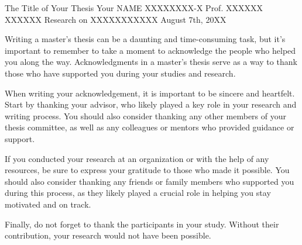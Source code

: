 \documentclass[12pt, a4paper]{report}
\begin{document}
\makecover
  {The Title of Your Thesis}
  {Your NAME}
  {XXXXXXXX-X}
  {Prof. XXXXXX XXXXXX}
  {Research on XXXXXXXXXXX}
  {August 7th, 20XX}

\frontmatter  %

\begin{acknowledgements}
Writing a master's thesis can be a daunting and time-consuming task, but it's
important to remember to take a moment to acknowledge the people who helped you
along the way. Acknowledgments in a master's thesis serve as a way to thank
those who have supported you during your studies and research.

When writing your acknowledgement, it is important to be sincere and heartfelt.
Start by thanking your advisor, who likely played a key role in your research
and writing process. You should also consider thanking any other members of
your thesis committee, as well as any colleagues or mentors who provided
guidance or support.

If you conducted your research at an organization or with the help of any
resources, be sure to express your gratitude to those who made it possible.
You should also consider thanking any friends or family members who supported
you during this process, as they likely played a crucial role in helping you
stay motivated and on track.

Finally, do not forget to thank the participants in your study. Without their
contribution, your research would not have been possible.
\end{acknowledgements}

\begin{abstract}
The abstract is an important component of your thesis. Presented at the
beginning of the thesis, it is likely the first substantive description of your
work read by an external examiner. You should view it as an opportunity to set
accurate expectations.

The abstract is a summary of the whole thesis. It presents all the major
elements of your work in a highly condensed form. An abstract often functions,
together with the thesis title, as a stand-alone text. Abstracts appear, absent
the full text of the thesis, in bibliographic indexes such as PsycInfo.

An abstract is not merely an introduction in the sense of a preface, preamble,
or advance organizer that prepares the reader for the thesis. In addition to
that function, it must be capable of substituting for the whole thesis when
there is insufficient time and space for the full text.

\end{abstract}
\end{document}
